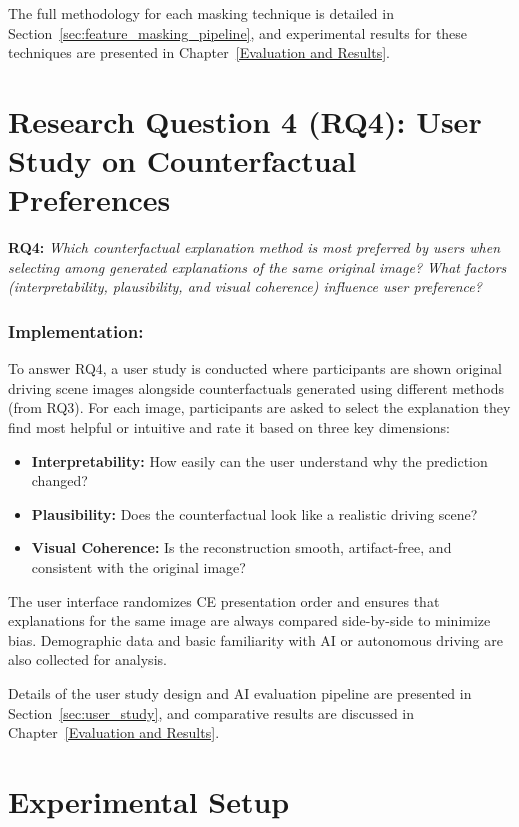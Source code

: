 The full methodology for each masking technique is detailed in Section~\ref{sec:feature_masking_pipeline}, and experimental results for these techniques are presented in Chapter~\ref{Evaluation and Results}.

\vspace{1em}
\section*{Research Question 4 (RQ4): User Study on Counterfactual Preferences}
\textbf{RQ4:} \textit{Which counterfactual explanation method is most preferred by users when selecting among generated explanations of the same original image? What factors (interpretability, plausibility, and visual coherence) influence user preference?}

    \subsubsection*{Implementation:}
    To answer RQ4, a user study is conducted where participants are shown original driving scene images alongside counterfactuals generated using different methods (from RQ3). For each image, participants are asked to select the explanation they find most helpful or intuitive and rate it based on three key dimensions:

    \begin{itemize}
        \item \textbf{Interpretability:} How easily can the user understand why the prediction changed?
        \item \textbf{Plausibility:} Does the counterfactual look like a realistic driving scene?
        \item \textbf{Visual Coherence:} Is the reconstruction smooth, artifact-free, and consistent with the original image?
    \end{itemize}

    The user interface randomizes CE presentation order and ensures that explanations for the same image are always compared side-by-side to minimize bias. Demographic data and basic familiarity with AI or autonomous driving are also collected for analysis.

    
    
    Details of the user study design and AI evaluation pipeline are presented in Section~\ref{sec:user_study}, and comparative results are discussed in Chapter~\ref{Evaluation and Results}.

\section{Experimental Setup}

